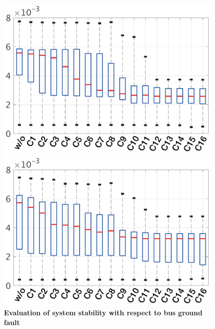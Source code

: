 \documentclass[graybox, envcountchap]{svmult}
\begin{document}
\begin{figure}[t!]
  \centering
  {
  \begin{minipage}{0.49\linewidth}
    \centering
    \includegraphics[width = 1.0\linewidth]{figs/boxplotgen}
  \end{minipage}
  \begin{minipage}{0.49\linewidth}
    \centering
    \includegraphics[width = 1.0\linewidth]{figs/boxplotload}
  \end{minipage}
  \medskip
  \caption{\textbf{Evaluation of system stability with respect to bus ground fault} }
  \label{fig:boxplots}
  }
\medskip
\end{figure}
\end{document}
